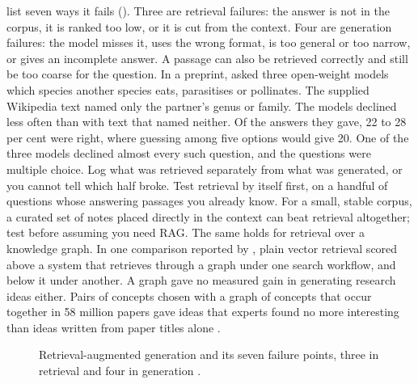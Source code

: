\textcite{kurniawan2024ragfailures} list seven ways it fails (). Three are retrieval
failures: the answer is not in the corpus, it is ranked too low, or it is cut
from the context. Four are generation failures: the model misses it, uses the
wrong format, is too general or too narrow, or gives an incomplete answer. A
passage can also be retrieved correctly and still be too coarse for the
question. In a preprint, \textcite{rayeed2026clade} asked three open-weight
models which species another species eats, parasitises or pollinates. The
supplied Wikipedia text named only the partner's genus or family. The models
declined less often than with text that named neither. Of the answers they
gave, 22 to 28 per cent were right, where guessing among five options would
give 20. One of the three models declined almost every such question, and the
questions were multiple choice. Log
what was retrieved separately from what was generated, or you cannot tell which
half broke. Test retrieval by itself first, on a handful of questions whose
answering passages you already know. For a small, stable corpus, a curated set of notes placed directly
in the context can beat retrieval altogether; test before assuming you need RAG.
The same holds for retrieval over a knowledge graph. In one comparison reported
by \textcite{liu2026graphllm}, plain vector retrieval scored above a system that
retrieves through a graph under one search workflow, and below it under
another. A graph gave no measured gain in generating research ideas either.
Pairs of concepts chosen with a graph of concepts that occur together in 58
million papers gave ideas that experts found no more interesting than ideas
written from paper titles alone \parencite{gu2026scimuse}.

\begin{figure}[htbp]
\centering
{}
\caption{Retrieval-augmented generation and its seven failure points, three in
retrieval and four in generation \parencite{kurniawan2024ragfailures}.}
\label{fig:rag}
\end{figure}
